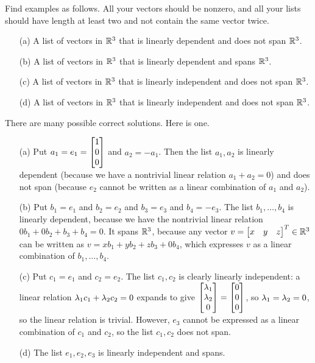 \documentclass[a4paper]{amsart}
\renewenvironment{solution}{\SolutionInline}{\endSolutionInline}
\begin{document}
\begin{exercise}\label{ex-independent-iii}
 Find examples as follows.  All your vectors should be nonzero, and
 all your lists should have length at least two and not contain the
 same vector twice.
 \begin{itemize}
  \item[(a)] A list of vectors in ${\mathbb{R}}^3$ that is linearly dependent
   and does not span ${\mathbb{R}}^3$.
  \item[(b)] A list of vectors in ${\mathbb{R}}^3$ that is linearly dependent
   and spans ${\mathbb{R}}^3$.
  \item[(c)] A list of vectors in ${\mathbb{R}}^3$ that is linearly independent
   and does not span ${\mathbb{R}}^3$.
  \item[(d)] A list of vectors in ${\mathbb{R}}^3$ that is linearly independent
   and does not span ${\mathbb{R}}^3$.
 \end{itemize}
\end{exercise}
\begin{solution}
 There are many possible correct solutions.  Here is one.
 \begin{itemize}
  \item[(a)] Put $a_1=e_1=\left[\begin{matrix} 1\\0\\0\end{matrix}\right]$ and $a_2=-a_1$.  Then the
   list $a_1,a_2$ is linearly dependent (because we have a nontrivial
   linear relation $a_1+a_2=0$) and does not span (because $e_2$
   cannot be written as a linear combination of $a_1$ and $a_2$).
  \item[(b)] Put $b_1=e_1$ and $b_2=e_2$ and $b_3=e_3$ and
   $b_4=-e_3$.  The list $b_1,\dotsc,b_4$ is linearly dependent,
   because we have the nontrivial linear relation
   $0b_1+0b_2+b_3+b_4=0$.  It spans ${\mathbb{R}}^3$, because any vector
   $v=\left[\begin{matrix} x&y&z\end{matrix}\right]^T\in{\mathbb{R}}^3$ can be written as
   $v=xb_1+yb_2+zb_3+0b_4$, which expresses $v$ as a linear
   combination of $b_1,\dotsc,b_4$.
  \item[(c)] Put $c_1=e_1$ and $c_2=e_2$.  The list $c_1,c_2$ is
   clearly linearly independent: a linear relation
   $\lambda_1c_1+\lambda_2c_2=0$ expands to give
   $\left[\begin{matrix} \lambda_1\\\lambda_2\\0\end{matrix}\right]=\left[\begin{matrix} 0\\0\\0\end{matrix}\right]$, so $\lambda_1=\lambda_2=0$, so
   the linear relation is trivial.  However, $e_3$ cannot be expressed
   as a linear combination of $c_1$ and $c_2$, so the list $c_1,c_2$
   does not span.
  \item[(d)] The list $e_1,e_2,e_3$ is linearly independent and spans.
 \end{itemize}
\end{solution}
\end{document}
